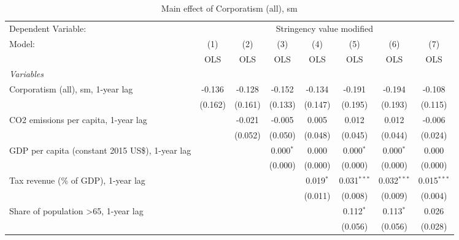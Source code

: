 
\begin{table}[htbp]
   \caption{Main effect of Corporatism (all), sm}
   \centering
   \begin{tabular}{lccccccc}
      \toprule
      Dependent Variable: & \multicolumn{7}{c}{Stringency value modified}\\
      Model:                                                & (1)     & (2)     & (3)         & (4)         & (5)           & (6)           & (7)\\  
                                                            &  OLS    & OLS     & OLS         & OLS         & OLS           & OLS           & OLS\\  
      \midrule
      \emph{Variables}\\
      Corporatism (all), sm, 1-year lag                     & -0.136  & -0.128  & -0.152      & -0.134      & -0.191        & -0.194        & -0.108\\   
                                                            & (0.162) & (0.161) & (0.133)     & (0.147)     & (0.195)       & (0.193)       & (0.115)\\   
      CO2 emissions per capita, 1-year lag                  &         & -0.021  & -0.005      & 0.005       & 0.012         & 0.012         & -0.006\\   
                                                            &         & (0.052) & (0.050)     & (0.048)     & (0.045)       & (0.044)       & (0.024)\\   
      GDP per capita (constant 2015 US\$), 1-year lag       &         &         & 0.000$^{*}$ & 0.000       & 0.000$^{*}$   & 0.000$^{*}$   & 0.000\\   
                                                            &         &         & (0.000)     & (0.000)     & (0.000)       & (0.000)       & (0.000)\\   
      Tax revenue (\% of GDP), 1-year lag                   &         &         &             & 0.019$^{*}$ & 0.031$^{***}$ & 0.032$^{***}$ & 0.015$^{***}$\\   
                                                            &         &         &             & (0.011)     & (0.008)       & (0.009)       & (0.004)\\   
      Share of population >65, 1-year lag                   &         &         &             &             & 0.112$^{*}$   & 0.113$^{*}$   & 0.026\\   
                                                            &         &         &             &             & (0.056)       & (0.056)       & (0.028)\\   

\end{tabular}
\end{table}
